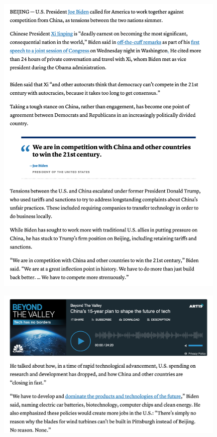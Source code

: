 \Continuing
\begin{center}
    \includegraphics[width=30em]{cnbc-biden-competition-p2}
\end{center}
\WillContinue
\pagebreak

\Continuing
\begin{center}
    \includegraphics[width=30em]{cnbc-biden-competition-p3}
\end{center}

\pagebreak
